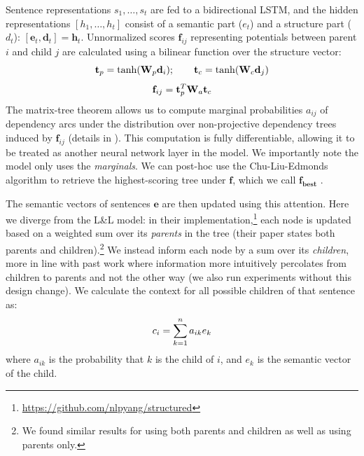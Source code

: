 Sentence representations $s_1, \ldots, s_t$ are fed to a bidirectional LSTM, and the hidden representations $[h_1 , \ldots, h_t]$ consist of a semantic part ($e_t$) and a structure part ($d_t$):
$[\mathbf{e}_t, \mathbf{d}_t] = \mathbf{h}_t$.
Unnormalized scores $\mathbf{f}_{ij}$ representing potentials between parent $i$ and child $j$ are calculated using a bilinear function over the structure vector:
\vspace{-0.7em}
\begin{equation}
\mathbf{t}_p = \tanh(\mathbf{W}_p\mathbf{d}_i);\hspace{20pt} \mathbf{t}_c = \tanh(\mathbf{W}_c\mathbf{d}_j)
\vspace{-0.7em}
\end{equation} 
\begin{equation}
\mathbf{f}_{ij} = \mathbf{t}^T_p \mathbf{W}_a\mathbf{t}_c
\vspace{-0.3em}
\end{equation}
The matrix-tree theorem allows us to compute marginal probabilities $a_{ij}$ of dependency arcs under the distribution over non-projective dependency trees induced by $\mathbf{f}_{ij}$ (details in \citet{Koo:2007}). This computation is fully differentiable, allowing it to be treated as another neural network layer in the model. We importantly note the model only uses the \emph{marginals}. We can post-hoc use the Chu-Liu-Edmonds algorithm to retrieve the highest-scoring tree under $\mathbf{f}$, which we call $\mathbf{f_{best}}$ \cite{Chu:1965,Edmonds:1967}.

The semantic vectors of sentences $\mathbf{e}$ are then updated using this attention. Here we diverge from the L\&L model: in their implementation,\footnote{\url{https://github.com/nlpyang/structured}} each node is updated based on a weighted sum over its \emph{parents} in the tree (their paper states both parents and children).\footnote{We found similar results for using both parents and children as well as using parents only.} We instead inform each node by a sum over its \emph{children}, more in line with past work where information more intuitively percolates from children to parents and not the other way \cite{Ji:2017} (we also run experiments without this design change).
We calculate the context for all possible children of that sentence as: 
\vspace{-0.7em}
\begin{equation}
\label{eq:children}
c_i = \sum^{n}_{k=1}a_{ik}e_{k}
\vspace{-0.3em}
\end{equation}
where $a_{ik}$ is the probability that $k$ is the child of $i$, and $e_k$ is the semantic vector of the child.

